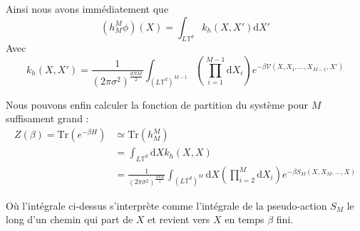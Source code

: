 \documentclass[11pt]{article}
\newcommand{\dom}{L\mathbb{T}^d}
\begin{document}
Ainsi nous avons immédiatement que 
\begin{equation}
(h_M^M\phi)(X)=\int_{\dom}k_h(X,X')\mathrm{d}X'
\end{equation}
Avec 
\begin{equation}
k_h(X,X')=\frac{1}{(2\pi\sigma^2)^\frac{dNM}{2}}\int_{(\dom)^{M-1}} \left(\prod_{i=1}^{M-1}\mathrm{d}X_i\right) e^{-\beta \mathcal{V}(X,X_1,\ldots,X_{M-1},X')}
\end{equation}

Nous pouvons enfin calculer la fonction de partition du système pour $M$ suffisament grand :
\begin{align*}
Z(\beta)=\mathrm{Tr}(e^{-\beta H})& \simeq \mathrm{Tr}(h_M^M)
\\
&= \int_{\dom}\mathrm{d}X k_h(X,X)
\\
&= \frac{1}{(2\pi\sigma^2)^\frac{dNM}{2}}\int_{(\dom)^{M}} \mathrm{d}X\left(\prod_{i=2}^{M}\mathrm{d}X_i\right) e^{-\beta S_M(X,X_M,\ldots,X)}
\end{align*}

Où l'intégrale ci-dessus s'interprète comme l'intégrale de la pseudo-action $S_M$ le long d'un chemin qui part de $X$ et revient vers $X$ en temps $\beta$ fini.
\end{document}
